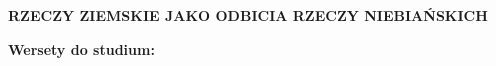 \documentclass[10pt,a4paper,oneside]{article}
\begin{document}
\centerline{\textbf{\MakeUppercase{Rzeczy ziemskie jako odbicia rzeczy niebiańskich}}}
\begin{center}
\textbf{Wersety do studium:} 

\end{center}
\end{document}
